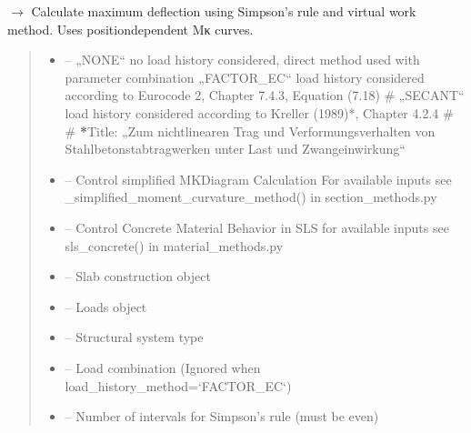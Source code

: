 \documentclass[a4paper,11pt,german]{sphinxmanual}
\begin{document}
\begin{fulllineitems}
\begin{fulllineitems}
{{ $\rightarrow$ }}
\pysigstopsignatures
\sphinxAtStartPar
Calculate maximum deflection using Simpson’s rule and virtual work method.
Uses position\sphinxhyphen{}dependent M\sphinxhyphen{}κ curves.
\begin{quote}\begin{description}
\begin{itemize}
\item {} 
\sphinxAtStartPar
{} – 
\sphinxAtStartPar
„NONE“      no load history considered, direct method used with parameter combination
„FACTOR\_EC“    load history considered according to Eurocode 2, Chapter 7.4.3, Equation (7.18)
\# „SECANT“    load history considered according to Kreller (1989)*, Chapter 4.2.4
\#
\# {\color{red}\bfseries{}*}Title: „Zum nichtlinearen Trag\sphinxhyphen{} und Verformungsverhalten von Stahlbetonstabtragwerken unter Last\sphinxhyphen{} und Zwangeinwirkung“


\item {} 
\sphinxAtStartPar
{} – Control simplified M\sphinxhyphen{}K\sphinxhyphen{}Diagram Calculation
For available inputs see \_simplified\_moment\_curvature\_method() in section\_methods.py

\item {} 
\sphinxAtStartPar
{} – Control Concrete Material Behavior in SLS
for available inputs see sls\_concrete() in material\_methods.py

\item {} 
\sphinxAtStartPar
{} – Slab construction object

\item {} 
\sphinxAtStartPar
{} – Loads object

\item {} 
\sphinxAtStartPar
{} – Structural system type

\item {} 
\sphinxAtStartPar
{} – Load combination (Ignored when load\_history\_method=‘FACTOR\_EC‘)

\item {} 
\sphinxAtStartPar
{} – Number of intervals for Simpson’s rule (must be even)


\end{itemize}
\end{description}
\end{quote}
\end{fulllineitems}
\end{fulllineitems}
\end{document}
